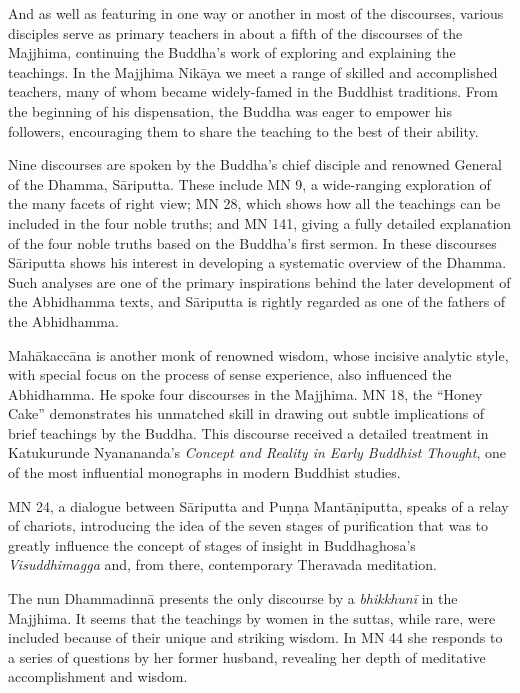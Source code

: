 \documentclass[12pt,openany]{book}%
\begin{document}
And as well as featuring in one way or another in most of the discourses, various disciples serve as primary teachers in about a fifth of the discourses of the Majjhima, continuing the Buddha’s work of exploring and explaining the teachings. In the Majjhima \textsanskrit{Nikāya} we meet a range of skilled and accomplished teachers, many of whom became widely-famed in the Buddhist traditions. From the beginning of his dispensation, the Buddha was eager to empower his followers, encouraging them to share the teaching to the best of their ability.

Nine discourses are spoken by the Buddha’s chief disciple and renowned General of the Dhamma, \textsanskrit{Sāriputta}. These include MN 9, a wide-ranging exploration of the many facets of right view; MN 28, which shows how all the teachings can be included in the four noble truths; and MN 141, giving a fully detailed explanation of the four noble truths based on the Buddha’s first sermon. In these discourses \textsanskrit{Sāriputta} shows his interest in developing a systematic overview of the Dhamma. Such analyses are one of the primary inspirations behind the later development of the Abhidhamma texts, and \textsanskrit{Sāriputta} is rightly regarded as one of the fathers of the Abhidhamma.

\textsanskrit{Mahākaccāna} is another monk of renowned wisdom, whose incisive analytic style, with special focus on the process of sense experience, also influenced the Abhidhamma. He spoke four discourses in the Majjhima. MN 18, the “Honey Cake” demonstrates his unmatched skill in drawing out subtle implications of brief teachings by the Buddha. This discourse received a detailed treatment in Katukurunde Nyanananda’s \textit{Concept and Reality in Early Buddhist Thought}, one of the most influential monographs in modern Buddhist studies.

MN 24, a dialogue between \textsanskrit{Sāriputta} and \textsanskrit{Puṇṇa} \textsanskrit{Mantāṇiputta}, speaks of a relay of chariots, introducing the idea of the seven stages of purification that was to greatly influence the concept of stages of insight in Buddhaghosa’s \textit{Visuddhimagga} and, from there, contemporary Theravada meditation.

The nun \textsanskrit{Dhammadinnā} presents the only discourse by a \textit{\textsanskrit{bhikkhunī}} in the Majjhima. It seems that the teachings by women in the suttas, while rare, were included because of their unique and striking wisdom. In MN 44 she responds to a series of questions by her former husband, revealing her depth of meditative accomplishment and wisdom.
\end{document}
